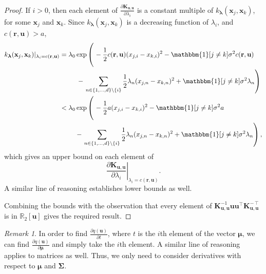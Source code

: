 \documentclass{article}
\theoremstyle{definition}
\theoremstyle{remark}
\newtheorem*{remark}{Remark}
\newcommand{\Kuu}{\mathbf{K}_{\mathbf{u},\mathbf{u}}}
\begin{document}
\begin{proof}
  If $i > 0$, then each element of $\frac{\partial \Kuu}{\partial
    \lambda_i}$ is a constant multiple of $k_{\bm\lambda}(\mathbf{x}_j,
  \mathbf{x}_k)$, for some $\mathbf{x}_j$ and $\mathbf{x}_k$. Since
  $k_{\bm\lambda}(\mathbf{x}_j, \mathbf{x}_k)$ is a decreasing function of
  $\lambda_i$, and $c(\mathbf{r}, \mathbf{u}) > a$,
  \[
    \begin{split}
      k_{\bm\lambda}(\mathbf{x}_j, \mathbf{x}_k)|_{\lambda_i = 
        c(\mathbf{r}, \mathbf{u})} &=
      \begin{multlined}[t]
        \lambda_0 \exp \left( \vphantom{\sum_{n \in \{ \} \setminus}}
        \right. -\frac{1}{2}c(\mathbf{r}, \mathbf{u})(x_{j,i} - x_{k,i})^2 -
        \mathbbm{1}[j \ne k]\sigma^2c(\mathbf{r}, \mathbf{u}) \\
        - \left. \sum_{n \in \{ 1, \dots, d \} \setminus \{ i \}}
          \frac{1}{2} \lambda_n(x_{j,n} - x_{k,n})^2 + \mathbbm{1}[j \ne
          k]\sigma^2 \lambda_n \right)
      \end{multlined} \\
      &<
      \begin{multlined}[t]
        \lambda_0 \exp \left( \vphantom{\sum_{n \in \{ \} \setminus}}
        \right. -\frac{1}{2}a(x_{j,i} - x_{k,i})^2 -
        \mathbbm{1}[j \ne k]\sigma^2a \\
        - \left. \sum_{n \in \{ 1, \dots, d \} \setminus \{ i \}}
          \frac{1}{2} \lambda_n(x_{j,n} - x_{k,n})^2 + \mathbbm{1}[j \ne
          k]\sigma^2 \lambda_n \right),
      \end{multlined}
    \end{split}
  \]
  which gives an upper bound on each element of
  \[
    \left. \frac{\partial \Kuu}{\partial \lambda_i} \right|_{\lambda_i =
      c(\mathbf{r}, \mathbf{u})}.
  \]
  A similar line of reasoning establishes lower bounds as well.

  Combining the bounds with the observation that
  every element of
  $\Kuu^{-1}\mathbf{u}\mathbf{u}^\intercal\Kuu^{-\intercal}$ is in
  $\mathbb{R}_2[\mathbf{u}]$ gives the required result.
\end{proof}

\begin{remark}
  In order to find $\frac{\partial q(\mathbf{u})}{\partial t}$,
  where $t$ is the $i$th element of the vector $\bm\mu$, we can
  find $\frac{\partial q(\mathbf{u})}{\partial \bm\mu}$ and simply take the
  $i$th element. A similar line of reasoning applies to matrices as well. Thus,
  we only need to consider derivatives with respect to $\bm\mu$ and
  $\bm\Sigma$.
\end{remark}
\end{document}
